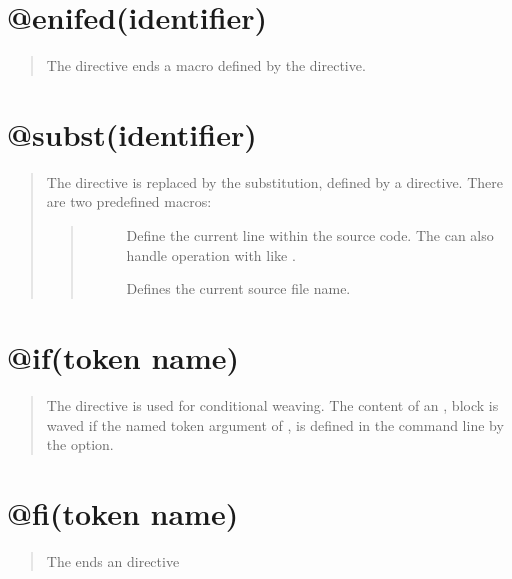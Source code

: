\documentclass[letterpaper,10pt,english]{sphinxmanual}
\begin{document}
\section{@enifed(identifier)}
\label{getting_started:enifed-identifier}\begin{quote}

The  directive ends a macro defined by the
 directive.
\end{quote}


\section{@subst(identifier)}
\label{getting_started:subst-identifier}\begin{quote}

The  directive is replaced by the substitution,
defined by a  directive. There are two predefined
macros:
\begin{quote}
\begin{description}
\item[{}] \leavevmode
Define the current line within the source code. The
 can also handle operation with 
like .

\item[{}] \leavevmode
Defines the current source file name.

\end{description}
\end{quote}
\end{quote}


\section{@if(token name)}
\label{getting_started:if-token-name}\begin{quote}

The  directive is used for conditional weaving.
The content of an ,  block is waved if the
named token argument of , is defined in the command line
by the  option.
\end{quote}


\section{@fi(token name)}
\label{getting_started:fi-token-name}\begin{quote}

The  ends an  directive
\end{quote}
\end{document}
